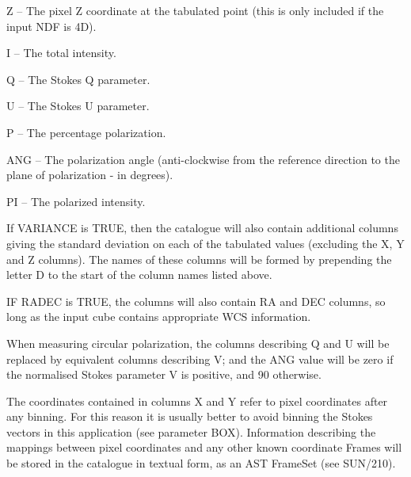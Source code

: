 \documentclass[twoside,11pt]{starlink}
\begin{document}
{{{{            \sstitem
               Z  -- The pixel Z coordinate at the tabulated point (this
                       is only included if the input NDF is 4D).

            \sstitem
               I  -- The total intensity.

            \sstitem
               Q  -- The Stokes Q parameter.

            \sstitem
               U  -- The Stokes U parameter.

            \sstitem
               P  -- The percentage polarization.

            \sstitem
               ANG  -- The polarization angle (anti-clockwise from the
               reference direction to the plane of polarization - in degrees).

            \sstitem
               PI -- The polarized intensity.

         }
         If VARIANCE is TRUE, then the catalogue will also contain
         additional columns giving the standard deviation on each of the
         tabulated values (excluding the X, Y and Z columns). The names of
         these columns will be formed by prepending the letter D to the
         start of the column names listed above.

         IF RADEC is TRUE, the columns will also contain RA and DEC
         columns, so long as the input cube contains appropriate WCS
         information.

         When measuring circular polarization, the columns describing Q
         and U will be replaced by equivalent columns describing V; and
         the ANG value will be zero if the normalised Stokes parameter V
         is positive, and 90 otherwise.

         The coordinates contained in columns X and Y refer to pixel
         coordinates after any binning. For this reason it is usually better
         to avoid binning the Stokes vectors in this application (see
         parameter BOX). Information describing the mappings between pixel
         coordinates and any other known coordinate Frames will be stored in
         the catalogue in textual form, as an AST FrameSet (see SUN/210).

}}}
\end{document}
